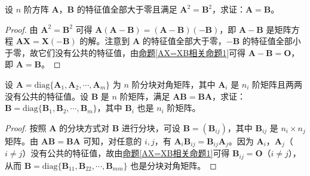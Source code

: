 \documentclass[../../main.tex]{subfiles}%
\begin{document}
\begin{example}\label{example:分块准对角阵的块之间两两没有公共特征值则与其可交换的矩阵也有同样分块}
设 \(n\) 阶方阵 \(\boldsymbol{A}\)，\(\boldsymbol{B}\) 的特征值全部大于零且满足 \(\boldsymbol{A}^2 = \boldsymbol{B}^2\)，求证：\(\boldsymbol{A} = \boldsymbol{B}\)。
\end{example}
\begin{proof}
由 \(\boldsymbol{A}^2 = \boldsymbol{B}^2\) 可得 \(\boldsymbol{A}(\boldsymbol{A - B}) = (\boldsymbol{A - B})(-\boldsymbol{B})\)，即 \(\boldsymbol{A - B}\) 是矩阵方程 \(\boldsymbol{AX = X(-B)}\) 的解。注意到 \(\boldsymbol{A}\) 的特征值全部大于零，\(-\boldsymbol{B}\) 的特征值全部小于零，故它们没有公共的特征值，由\hyperref[AX=XB相关命题1]{命题\ref{AX=XB相关命题1}}可得 \(\boldsymbol{A - B} = \boldsymbol{O}\)，即 \(\boldsymbol{A} = \boldsymbol{B}\)。
\end{proof}

\begin{example}
设 \(\boldsymbol{A} = \mathrm{diag}\{\boldsymbol{A}_1,\boldsymbol{A}_2,\cdots,\boldsymbol{A}_m\}\) 为 \(n\) 阶分块对角矩阵，其中 \(\boldsymbol{A}_i\) 是 \(n_i\) 阶矩阵且两两没有公共的特征值。设 \(\boldsymbol{B}\) 是 \(n\) 阶矩阵，满足 \(\boldsymbol{AB = BA}\)，求证：\(\boldsymbol{B} = \mathrm{diag}\{\boldsymbol{B}_1,\boldsymbol{B}_2,\cdots,\boldsymbol{B}_m\}\)，其中 \(\boldsymbol{B}_i\) 也是 \(n_i\) 阶矩阵。
\end{example}
\begin{proof}
按照 \(\boldsymbol{A}\) 的分块方式对 \(\boldsymbol{B}\) 进行分块，可设 \(\boldsymbol{B} = (\boldsymbol{B}_{ij})\)，其中 \(\boldsymbol{B}_{ij}\) 是 \(n_i\times n_j\) 矩阵。由 \(\boldsymbol{AB = BA}\) 可知，对任意的 \(i,j\)，有 \(\boldsymbol{A}_i\boldsymbol{B}_{ij} = \boldsymbol{B}_{ij}\boldsymbol{A}_j\)。因为 \(\boldsymbol{A}_i\)，\(\boldsymbol{A}_j\)（\(i\neq j\)）没有公共的特征值，故由\hyperref[AX=XB相关命题1]{命题\ref{AX=XB相关命题1}}可得 \(\boldsymbol{B}_{ij} = \boldsymbol{O}\)（\(i\neq j\)），从而 \(\boldsymbol{B} = \mathrm{diag}\{\boldsymbol{B}_{11},\boldsymbol{B}_{22},\cdots,\boldsymbol{B}_{mm}\}\) 也是分块对角矩阵。
\end{proof}
\end{document}
